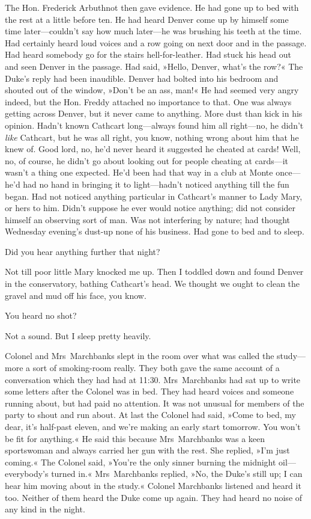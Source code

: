 The Hon. Frederick Arbuthnot then gave evidence. He had gone up to bed with the rest at a little before ten. He had heard Denver come up by himself some time later—couldn't say how much later—he was brushing his teeth at the time.  Had certainly heard loud voices and a row going on next door and in the passage. Had heard somebody go for the stairs hell-for-leather. Had stuck his head out and seen Denver in the passage. Had said, »Hello, Denver, what's the row?« The Duke's reply had been inaudible. Denver had bolted into his bedroom and shouted out of the window, »Don't be an ass, man!« He had seemed very angry indeed, but the Hon. Freddy attached no importance to that.  One was always getting across Denver, but it never came to anything.  More dust than kick in his opinion. Hadn't known Cathcart long—always found him all right—no, he didn't \textit{like} Cathcart, but he was all right, you know, nothing wrong about him that he knew of. Good lord, no, he'd never heard it suggested he cheated at cards! Well, no, of course, he didn't go about looking out for people cheating at cards—it wasn't a thing one expected. He'd been had that way in a club at Monte once—he'd had no hand in bringing it to light—hadn't noticed anything till the fun began. Had not noticed anything particular in Cathcart's manner to Lady Mary, or hers to him. Didn't suppose he ever would notice anything; did not consider himself an observing sort of man. Was not interfering by nature; had thought Wednesday evening's dust-up none of his business. Had gone to bed and to sleep.

\begin{dialogue}

 Did you hear anything further that night?

 Not till poor little Mary knocked me up. Then I toddled down and found Denver in the conservatory, bathing Cathcart's head. We thought we ought to clean the gravel and mud off his face, you know.

 You heard no shot?

 Not a sound. But I sleep pretty heavily.
\end{dialogue}

Colonel and Mrs~Marchbanks slept in the room over what was called the study—more a sort of smoking-room really. They both gave the same account of a conversation which they had had at 11:30. Mrs~Marchbanks had sat up to write some letters after the Colonel was in bed. They had heard voices and someone running about, but had paid no attention.  It was not unusual for members of the party to shout and run about.  At last the Colonel had said, »Come to bed, my dear, it's half-past eleven, and we're making an early start tomorrow. You won't be fit for anything.« He said this because Mrs~Marchbanks was a keen sportswoman and always carried her gun with the rest. She replied, »I'm just coming.« The Colonel said, »You're the only sinner burning the midnight oil—everybody's turned in.« Mrs~Marchbanks replied, »No, the Duke's still up; I can hear him moving about in the study.« Colonel Marchbanks listened and heard it too. Neither of them heard the Duke come up again. They had heard no noise of any kind in the night.

